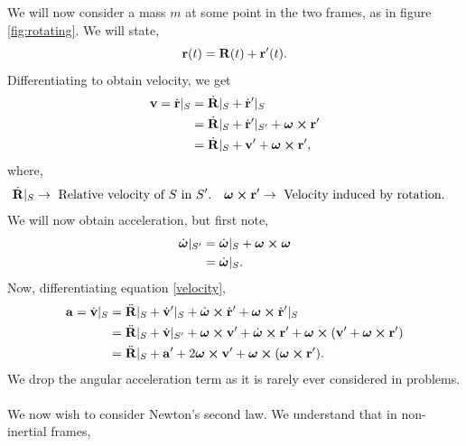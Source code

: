 \documentclass{book}
\begin{document}
We will now consider a mass $m$ at some point in the two frames, as in figure \ref{fig:rotating}. We will state,
\begin{equation}
    \vb{r}(t) = \vb{R}(t) + \vb{r}'(t).
\end{equation}
Differentiating to obtain velocity, we get
\begin{equation}\label{velocity}
    \begin{split}
        \vb{v} = \Dot{\vb{r}}|_S & = \Dot{\vb{R}}|_S + \Dot{\vb{r}}'|_S \\
        & = \Dot{\vb{R}}|_S + \Dot{\vb{r}}'|_{S'} + \vb*{\omega}\cross\vb{r}' \\
        & = \Dot{\vb{R}}|_S + \vb{v}' + \vb*{\omega}\cross\vb{r}',
    \end{split}
\end{equation}
where,
\begin{align}
    \Dot{\vb{R}}|_S &\to \text{ Relative velocity of $S$ in $S'$.} & \vb*{\omega}\cross\vb{r}' &\to \text{ Velocity induced by rotation.}
\end{align}
We will now obtain acceleration, but first note,
\begin{equation}
    \begin{split}
        \Dot{\vb*{\omega}}|_{S'} & = \Dot{\vb*{\omega}}|_S + \vb*{\omega}\cross\vb*{\omega} \\
        & = \Dot{\vb*{\omega}}|_S.
    \end{split}
\end{equation}
Now, differentiating equation \eqref{velocity},
\begin{equation}
\begin{split}
    \vb{a} = \Dot{\vb{v}}|_S & = \Ddot{\vb{R}}|_S + \Dot{\vb{v}}'|_S + \Dot{\vb*{\omega}}\cross\Dot{\vb{r}}' + \vb*{\omega}\cross\Dot{\vb{r}}'|_S \\
    & = \Ddot{\vb{R}}|_S + \Dot{\vb{v}}|_{S'} + \vb*{\omega}\cross\vb{v}' + \Dot{\vb*{\omega}}\cross \vb{r}' + \vb*{\omega} \cross(\vb{v'} + \vb*{\omega}\cross \vb{r}') \\
    & =  \Ddot{\vb{R}}|_S + \vb{a}' + 2\vb*{\omega}\cross\vb{v}' + \vb*{\omega}\cross(\vb*{\omega}\cross \vb{r}').
\end{split} \label{differential equation for motion}
\end{equation}
We drop the angular acceleration term as it is rarely ever considered in problems. \\\\
We now wish to consider Newton's second law. We understand that in non-inertial frames,
\end{document}
